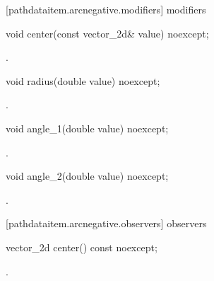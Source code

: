  [pathdataitem.arcnegative.modifiers]{ modifiers}

\begin{itemdecl}
    void center(const vector_2d& value) noexcept;
\end{itemdecl}
\begin{itemdescr}
	\pnum
	\postconditions
	.
\end{itemdescr}

\begin{itemdecl}
    void radius(double value) noexcept;
\end{itemdecl}
\begin{itemdescr}
	\pnum
	\postconditions
	.
\end{itemdescr}

\begin{itemdecl}
    void angle_1(double value) noexcept;
\end{itemdecl}
\begin{itemdescr}
	\pnum
	\postconditions
	.
\end{itemdescr}

\begin{itemdecl}
    void angle_2(double value) noexcept;
\end{itemdecl}
\begin{itemdescr}
	\pnum
	\postconditions
	.
\end{itemdescr}

 [pathdataitem.arcnegative.observers]{ observers}

\begin{itemdecl}
    vector_2d center() const noexcept;
\end{itemdecl}
\begin{itemdescr}
	\pnum
	\returns
	.
\end{itemdescr}

